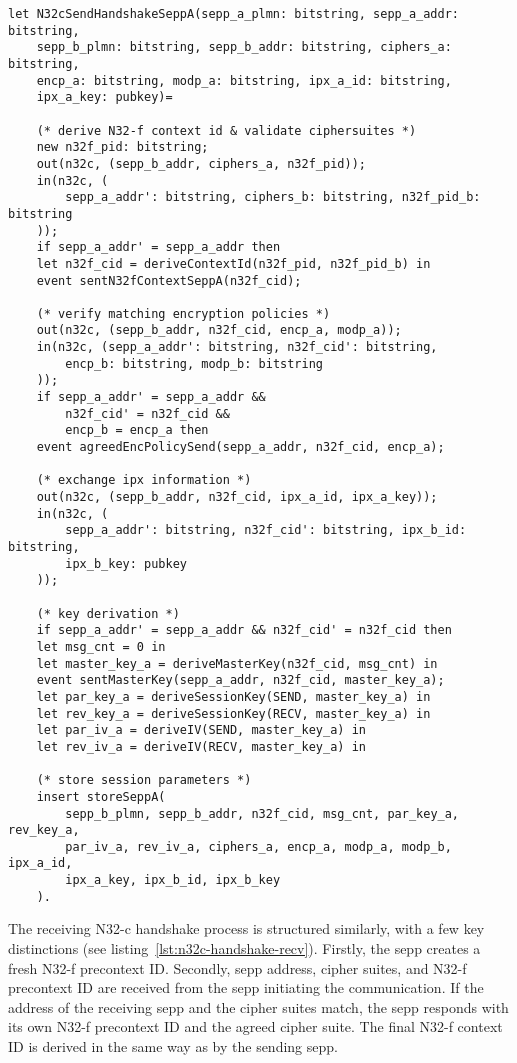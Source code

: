 \begin{lstlisting}[caption={Definition of the sending N32-c handshake process},label={lst:n32c-handshake-send},firstnumber=307]
let N32cSendHandshakeSeppA(sepp_a_plmn: bitstring, sepp_a_addr: bitstring,
    sepp_b_plmn: bitstring, sepp_b_addr: bitstring, ciphers_a: bitstring,
    encp_a: bitstring, modp_a: bitstring, ipx_a_id: bitstring,
    ipx_a_key: pubkey)=

    (* derive N32-f context id & validate ciphersuites *)
    new n32f_pid: bitstring;
    out(n32c, (sepp_b_addr, ciphers_a, n32f_pid));
    in(n32c, (
        sepp_a_addr': bitstring, ciphers_b: bitstring, n32f_pid_b: bitstring
    ));
    if sepp_a_addr' = sepp_a_addr then
    let n32f_cid = deriveContextId(n32f_pid, n32f_pid_b) in
    event sentN32fContextSeppA(n32f_cid);

    (* verify matching encryption policies *)
    out(n32c, (sepp_b_addr, n32f_cid, encp_a, modp_a));
    in(n32c, (sepp_a_addr': bitstring, n32f_cid': bitstring,
        encp_b: bitstring, modp_b: bitstring
    ));
    if sepp_a_addr' = sepp_a_addr &&
        n32f_cid' = n32f_cid &&
        encp_b = encp_a then
    event agreedEncPolicySend(sepp_a_addr, n32f_cid, encp_a);

    (* exchange ipx information *)
    out(n32c, (sepp_b_addr, n32f_cid, ipx_a_id, ipx_a_key));
    in(n32c, (
        sepp_a_addr': bitstring, n32f_cid': bitstring, ipx_b_id: bitstring,
        ipx_b_key: pubkey
    ));

    (* key derivation *)
    if sepp_a_addr' = sepp_a_addr && n32f_cid' = n32f_cid then
    let msg_cnt = 0 in
    let master_key_a = deriveMasterKey(n32f_cid, msg_cnt) in
    event sentMasterKey(sepp_a_addr, n32f_cid, master_key_a);
    let par_key_a = deriveSessionKey(SEND, master_key_a) in
    let rev_key_a = deriveSessionKey(RECV, master_key_a) in
    let par_iv_a = deriveIV(SEND, master_key_a) in
    let rev_iv_a = deriveIV(RECV, master_key_a) in

    (* store session parameters *)
    insert storeSeppA(
        sepp_b_plmn, sepp_b_addr, n32f_cid, msg_cnt, par_key_a, rev_key_a,
        par_iv_a, rev_iv_a, ciphers_a, encp_a, modp_a, modp_b, ipx_a_id,
        ipx_a_key, ipx_b_id, ipx_b_key
    ).
\end{lstlisting}

The receiving N32-c handshake process is structured similarly, with a few key distinctions (see listing~\ref{lst:n32c-handshake-recv}).
Firstly, the \gls{sepp} creates a fresh N32-f precontext ID.
Secondly, \gls{sepp} address, cipher suites, and N32-f precontext ID are received from the \gls{sepp} initiating the communication.
If the address of the receiving \gls{sepp} and the cipher suites match, the \gls{sepp} responds with its own N32-f precontext ID and the agreed cipher suite.
The final N32-f context ID is derived in the same way as by the sending \gls{sepp}.

